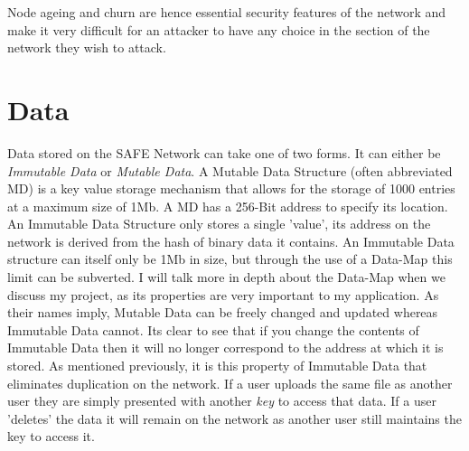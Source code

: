 \documentclass{l4proj}
\begin{document}
Node ageing and churn are hence essential security features of the network and make it very difficult for an attacker to have any choice in the section of the network they wish to attack.

\section{Data}

Data stored on the SAFE Network can take one of two forms. It can either be \textit{Immutable Data} or \textit{Mutable Data}. A Mutable Data Structure (often abbreviated MD) is a key value storage mechanism that allows for the storage of 1000 entries at a maximum size of 1Mb. A MD has a 256-Bit address to specify its location. An Immutable Data Structure only stores a single 'value', its address on the network is derived from the hash of binary data it contains. An Immutable Data structure can itself only be 1Mb in size, but through the use of a Data-Map this limit can be subverted. I will talk more in depth about the Data-Map when we discuss my project, as its properties are very important to my application. As their names imply, Mutable Data can be freely changed and updated whereas Immutable Data cannot. Its clear to see that if you change the contents of Immutable Data then it will no longer correspond to the address at which it is stored. As mentioned previously, it is this property of Immutable Data that eliminates duplication on the network. If a user uploads the same file as another user they are simply presented with another \textit{key} to access that data. If a user 'deletes' the data it will remain on the network as another user still maintains the key to access it.


\printbibliography
\end{document}

